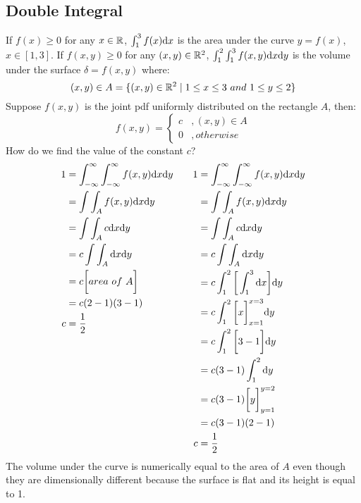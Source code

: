 \documentclass[letterpaper, 12pt]{math}
\begin{document}
\subsection*{Double Integral}
If \( f(x)\geq0 \) for any \( x\in\mathbb{R} \), \( \int_{1}^{3}f(x)\mathrm{d}{x} \) is
the area under the curve \( y = f(x) \), \( x\in[1,3] \). If \( f(x,y)\geq0 \)
for any \( (x,y)\in\mathbb{R}^{2} \), \( \int_{1}^{2}\int_{1}^{3}f(x,y)\mathrm{d}{x}\mathrm{d}{y}
\) is the volume under the surface \( \delta = f(x,y) \) where:
\[ (x,y)\in A = \{(x,y)\in\mathbb{R}^{2}\mid 1\leq x\leq 3\ and\ 1\leq y\leq 2 \} \]
Suppose \( f(x,y) \) is the joint pdf uniformly distributed on the rectangle
\( A \), then:
\[ f(x,y) = \begin{cases}
  c &, (x,y)\in A \\
  0 &, otherwise\end{cases}
\]
How do we find the value of the constant \( c \)?
\begin{equation*}
  \begin{aligned}[t]
    1 &= \int_{-\infty}^{\infty}\int_{-\infty}^{\infty}f(x,y)\mathrm{d}{x}\mathrm{d}{y} \\
    &= \int\int_{A}f(x,y)\mathrm{d}{x}\mathrm{d}{y} \\
    &= \int\int_{A}c\mathrm{d}{x}\mathrm{d}{y} \\
    &= c\int\int_{A}\mathrm{d}{x}\mathrm{d}{y} \\
    &= c\bigg[area\ of\ A\bigg] \\
    &= c(2-1)(3-1) \\
    c &= \frac{1}{2}
  \end{aligned}
  \quad\quad
  \begin{aligned}[t]
    1 &= \int_{-\infty}^{\infty}\int_{-\infty}^{\infty}f(x,y)\mathrm{d}{x}\mathrm{d}{y} \\
    &= \int\int_{A}f(x,y)\mathrm{d}{x}\mathrm{d}{y} \\
    &= \int\int_{A}c\mathrm{d}{x}\mathrm{d}{y} \\
    &= c\int\int_{A}\mathrm{d}{x}\mathrm{d}{y} \\
    &= c\int_{1}^{2}\bigg[\int_{1}^{3}\mathrm{d}{x}\bigg]\mathrm{d}{y} \\
    &= c\int_{1}^{2}\bigg[x\bigg]_{x=1}^{x=3}\mathrm{d}{y} \\
    &= c\int_{1}^{2}\bigg[3-1\bigg]\mathrm{d}{y} \\
    &= c(3-1)\int_{1}^{2}\mathrm{d}{y} \\
    &= c(3-1)\bigg[y\bigg]_{y=1}^{y=2} \\
    &= c(3-1)(2-1) \\
    c &= \frac{1}{2}
  \end{aligned}
\end{equation*}
The volume under the curve is numerically equal to the area of \( A \) even
though they are dimensionally different because the surface is flat and its
height is equal to 1.
\end{document}
